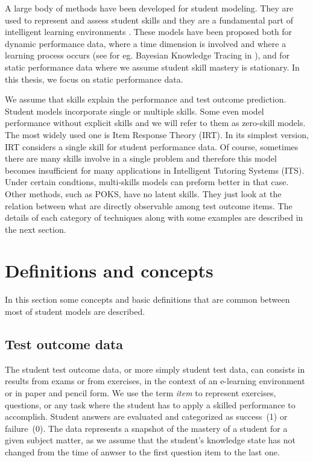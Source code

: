 \label{sec:RevLitt}

A large body of methods have been developed for student modeling.  They are used to represent and assess student skills and they are a fundamental part of intelligent learning environments \citep{Desmarais2011}. These models have been proposed both for dynamic performance data, where a time dimension is involved and where a learning process occurs (see for eg. Bayesian Knowledge Tracing in \citet{Koedinger2011}), and for static performance data where we assume student skill mastery is stationary.  In this thesis, we focus on static performance data.


We assume that skills explain the performance and test outcome prediction. Student models incorporate single or multiple skills.  Some even model performance without explicit skills and we will refer to them as zero-skill models. The most widely used one is Item Response Theory (IRT).  In its simplest version, IRT considers a single skill for student performance data. Of course, sometimes there are many skills involve in a single problem and therefore this model becomes insufficient for many applications in Intelligent Tutoring Systems (ITS). Under certain condtions, multi-skills models can preform better in that case. Other methods, such as POKS, have no latent skills. They just look at the relation between what are directly observable among test outcome items. The details of each category of techniques along with some examples are described in the next section.

\section{Definitions and concepts}

In this section some concepts and basic definitions that are common between most of student models are described. 
 
\subsection{Test outcome data}

The student test outcome data, or more simply student test data, can consists in results from exams or from exercises, in the context of an e-learning environment or in paper and pencil form.  We use the term \textit{item} to represent exercises, questions, or any task where the student has to apply a skilled performance to accomplish.  Student answers are evaluated and categorized as success~(1) or failure~(0).  The data represents a snapshot of the mastery of a student for a given subject matter, as we assume that the student's knowledge state has not changed from the time of anwser to the first question item to the last one.

